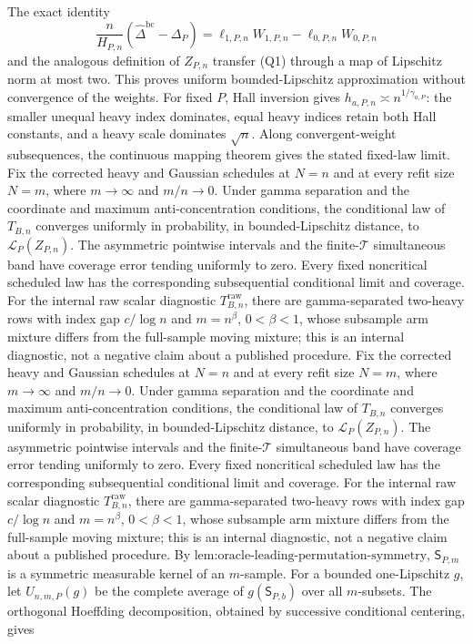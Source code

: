 The exact identity
\[
 \frac n{H_{P,n}}(\widehat\Delta^{\mathrm{bc}}-\Delta_P)
 =\ell_{1,P,n}W_{1,P,n}-\ell_{0,P,n}W_{0,P,n}
\]
and the analogous definition of \(Z_{P,n}\) transfer (Q1) through a map of Lipschitz norm at most two.  This proves uniform bounded-Lipschitz approximation without convergence of the weights.  For fixed \(P\), Hall inversion gives \(h_{a,P,n}\asymp n^{1/\gamma_{a,P}}\): the smaller unequal heavy index dominates, equal heavy indices retain both Hall constants, and a heavy scale dominates \(\sqrt n\).  Along convergent-weight subsequences, the continuous mapping theorem gives the stated fixed-law limit.
Fix the corrected heavy and Gaussian schedules at \(N=n\) and at every refit size \(N=m\), where \(m\to\infty\) and \(m/n\to0\).  Under gamma separation and the coordinate and maximum anti-concentration conditions, the conditional law of \(T_{B,n}\) converges uniformly in probability, in bounded-Lipschitz distance, to \(\mathcal L_P(Z_{P,n})\).  The asymmetric pointwise intervals and the finite-\(\mathcal T\) simultaneous band have coverage error tending uniformly to zero.  Every fixed noncritical scheduled law has the corresponding subsequential conditional limit and coverage.  For the internal raw scalar diagnostic \(T^{\mathrm{raw}}_{B,n}\), there are gamma-separated two-heavy rows with index gap \(c/\log n\) and \(m=n^\beta\), \(0<\beta<1\), whose subsample arm mixture differs from the full-sample moving mixture; this is an internal diagnostic, not a negative claim about a published procedure.
Fix the corrected heavy and Gaussian schedules at \(N=n\) and at every refit size \(N=m\), where \(m\to\infty\) and \(m/n\to0\).  Under gamma separation and the coordinate and maximum anti-concentration conditions, the conditional law of \(T_{B,n}\) converges uniformly in probability, in bounded-Lipschitz distance, to \(\mathcal L_P(Z_{P,n})\).  The asymmetric pointwise intervals and the finite-\(\mathcal T\) simultaneous band have coverage error tending uniformly to zero.  Every fixed noncritical scheduled law has the corresponding subsequential conditional limit and coverage.  For the internal raw scalar diagnostic \(T^{\mathrm{raw}}_{B,n}\), there are gamma-separated two-heavy rows with index gap \(c/\log n\) and \(m=n^\beta\), \(0<\beta<1\), whose subsample arm mixture differs from the full-sample moving mixture; this is an internal diagnostic, not a negative claim about a published procedure.
By \(\text{lem:oracle-leading-permutation-symmetry}\), \(\mathsf S_{P,m}\) is a symmetric measurable kernel of an \(m\)-sample.  For a bounded one-Lipschitz \(g\), let \(U_{n,m,P}(g)\) be the complete average of \(g(\mathsf S_{P,b})\) over all \(m\)-subsets.  The orthogonal Hoeffding decomposition, obtained by successive conditional centering, gives

